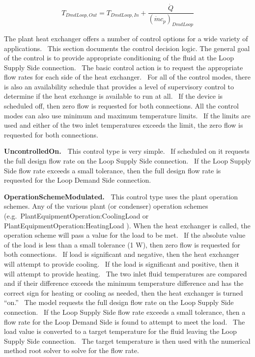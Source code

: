 \begin{equation}
{T_{DmdLoop,Out}} = {T_{DmdLoop,In}} + \frac{{\dot Q}}{{{{\left( {\dot m{c_p}} \right)}_{DmdLoop}}}}
\end{equation}

The plant heat exchanger offers a number of control options for a wide variety of applications.~ This section documents the control decision logic. The general goal of the control is to provide appropriate conditioning of the fluid at the Loop Supply Side connection. ~The basic control action is to request the appropriate flow rates for each side of the heat exchanger.~ For all of the control modes, there is also an availability schedule that provides a level of supervisory control to determine if the heat exchange is available to run at all.~ If the device is scheduled off, then zero flow is requested for both connections. All the control modes can also use minimum and maximum temperature limits.~ If the limits are used and either of the two inlet temperatures exceeds the limit, the zero flow is requested for both connections.

\textbf{UncontrolledOn.~} This control type is very simple.~ If scheduled on it requests the full design flow rate on the Loop Supply Side connection.~ If the Loop Supply Side flow rate exceeds a small tolerance, then the full design flow rate is requested for the Loop Demand Side connection.

\textbf{OperationSchemeModulated.~} This control type uses the plant operation schemes. Any of the various plant (or condenser) operation schemes (e.g.~PlantEquipmentOperation:CoolingLoad or PlantEquipmentOperation:HeatingLoad ). When the heat exchanger is called, the operation scheme will pass a value for the load to be met.~ If the absolute value of the load is less than a small tolerance (1 W), then zero flow is requested for both connections.~ If load is significant and negative, then the heat exchanger will attempt to provide cooling.~ If the load is significant and positive, then it will attempt to provide heating.~ The two inlet fluid temperatures are compared and if their difference exceeds the minimum temperature difference and has the correct sign for heating or cooling as needed, then the heat exchanger is turned ``on.''~ The model requests the full design flow rate on the Loop Supply Side connection.~ If the Loop Supply Side flow rate exceeds a small tolerance, then a flow rate for the Loop Demand Side is found to attempt to meet the load.~ The load value is converted to a target temperature for the fluid leaving the Loop Supply Side connection.~ The target temperature is then used with the numerical method root solver to solve for the flow rate.

